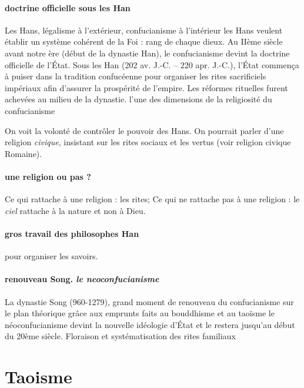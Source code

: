 \paragraph{doctrine officielle sous les Han}{Les Hans, légalisme à l'extérieur, confucianisme à l'intérieur}
les Hans veulent établir un système cohérent de la Foi  : rang de chaque dieux.
 Au IIème siècle avant notre ère (début de la dynastie Han), le confucianisme devint la doctrine officielle de l’État. Sous les Han (202 av. J.-C. – 220 apr. J.-C.), l’État commença à puiser dans la tradition confucéenne pour organiser les rites sacrificiels impériaux afin d’assurer la prospérité de l’empire.
Les réformes rituelles furent achevées au milieu de la dynastie.  
l’une des dimensions de la religiosité du confucianisme
\begin{Synthesis}
    On voit la volonté de contrôler le pouvoir des Hans.
    On pourrait parler d'une religion \textit{civique}, insistant sur les rites sociaux et les vertus (voir religion civique Romaine). 
\end{Synthesis}

\paragraph{une religion ou pas ? } Ce qui rattache à une religion : les rites; Ce qui ne rattache pas à une religion : le \textit{ciel} rattache à la nature et non à Dieu. 

\paragraph{gros travail des philosophes Han} pour organiser les savoirs.

\paragraph{renouveau Song. \textit{le neoconfucianisme}} La dynastie Song (960-1279), grand moment de renouveau du confucianisme sur le plan théorique grâce aux emprunts faits au bouddhisme et au taoïsme  le néoconfucianisme devint la nouvelle idéologie d’État et le restera jusqu’au début du 20ème siècle.
 Floraison et systématisation des rites familiaux


\section{Taoisme}

